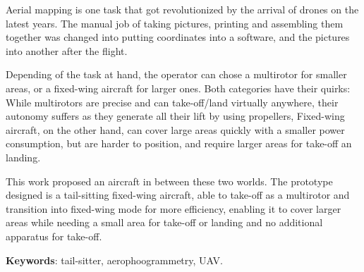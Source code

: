 \begin{resumo}[Abstract]

Aerial mapping is one task that got revolutionized by the arrival of drones on the latest years. The manual job of taking pictures, printing and assembling them together was changed into putting coordinates into a software, and the pictures into another after the flight.

Depending of the task at hand, the operator can chose a multirotor for smaller areas, or a fixed-wing aircraft for larger ones. Both categories have their quirks: While multirotors are precise and can take-off/land virtually anywhere, their autonomy suffers as they generate all their lift by using propellers, Fixed-wing aircraft, on the other hand, can cover large areas quickly with a smaller power consumption, but are harder to position, and require larger areas for take-off an landing.
 
This work proposed an aircraft in between these two worlds. The prototype designed is a tail-sitting fixed-wing aircraft, able to take-off as a multirotor and transition into fixed-wing mode for more efficiency, enabling it to cover larger areas while needing a small area for take-off or landing and no additional apparatus for take-off.	


   \vspace{\onelineskip}
 
   \noindent 
   \textbf{Keywords}: tail-sitter, aerophoogrammetry, UAV.

\end{resumo}
